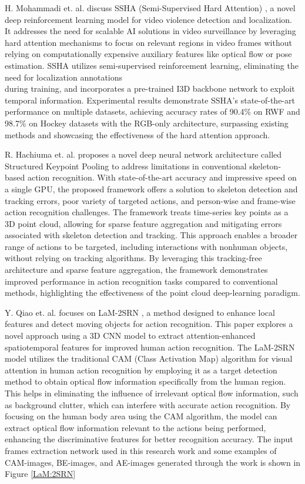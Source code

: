 \noindent H. Mohammadi et. al. discuss SSHA (Semi-Supervised Hard Attention) \cite{SSHM}, a novel deep reinforcement learning model for video violence detection and localization. It addresses the need for scalable AI solutions in video surveillance by leveraging hard attention mechanisms to focus on relevant regions in video frames without relying on computationally expensive auxiliary features like optical flow or pose estimation. SSHA utilizes semi-supervised reinforcement learning, eliminating the need for localization annotations \\ during training, and incorporates a pre-trained I3D backbone network to exploit temporal information. Experimental results demonstrate SSHA's state-of-the-art performance on multiple datasets, achieving accuracy rates of 90.4\% on RWF and 98.7\% on Hockey datasets with the RGB-only architecture, surpassing existing methods and showcasing the effectiveness of the hard attention approach.

\noindent R. Hachiuma et. al. proposes a novel deep neural network architecture called Structured Keypoint Pooling \cite{structured_kepoint_pooling} to address limitations in conventional skeleton-based action recognition. With state-of-the-art accuracy and impressive speed on a single GPU, the proposed framework offers a solution to skeleton detection and tracking errors, poor variety of targeted actions, and person-wise and frame-wise action recognition challenges. The framework treats time-series key points as a 3D point cloud, allowing for sparse feature aggregation and mitigating errors associated with skeleton detection and tracking. This approach enables a broader range of actions to be targeted, including interactions with nonhuman objects, without relying on tracking algorithms. By leveraging this tracking-free architecture and sparse feature aggregation, the framework demonstrates improved performance in action recognition tasks compared to conventional methods, highlighting the effectiveness of the point cloud deep-learning paradigm.

\noindent Y. Qiao et. al. focuses on LaM-2SRN \cite{LaM-2SRN}, a method designed to enhance local features and detect moving objects for action recognition. This paper explores a novel approach using a 3D CNN model to extract attention-enhanced spatiotemporal features for improved human action recognition. The LaM-2SRN model utilizes the traditional CAM (Class Activation Map) algorithm for visual attention in human action recognition by employing it as a target detection method to obtain optical flow information specifically from the human region. This helps in eliminating the influence of irrelevant optical flow information, such as background clutter, which can interfere with accurate action recognition. By focusing on the human body area using the CAM algorithm, the model can extract optical flow information relevant to the actions being performed, enhancing the discriminative features for better recognition accuracy. The input frames extraction network used in this research work and some examples of CAM-images, BE-images, and AE-images generated through the work is shown in Figure \ref{LaM:2SRN}

